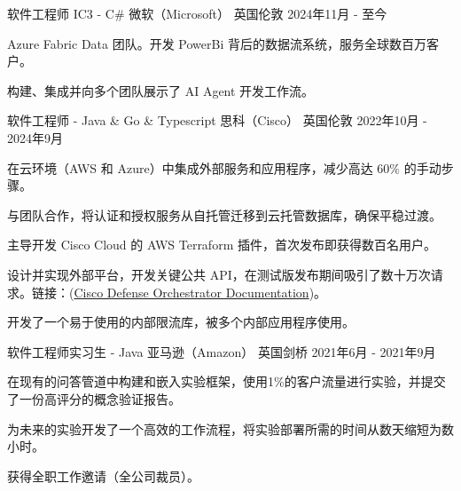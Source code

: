 
\begin{cventries}


\cventry
{软件工程师 IC3 - C\#} %
{微软（Microsoft）} %
{英国伦敦} %
{2024年11月 - 至今} %
{
\begin{cvitems} %
\item {Azure Fabric Data 团队。开发 PowerBi 背后的数据流系统，服务全球数百万客户。}
\item {构建、集成并向多个团队展示了 AI Agent 开发工作流。}
\end{cvitems}
}


\cventry
{软件工程师 - Java \& Go \& Typescript} %
{思科（Cisco）} %
{英国伦敦} %
{2022年10月 - 2024年9月} %
{
\begin{cvitems} %
\item {在云环境（AWS 和 Azure）中集成外部服务和应用程序，减少高达 60\% 的手动步骤。}
\item {与团队合作，将认证和授权服务从自托管迁移到云托管数据库，确保平稳过渡。}
\item {主导开发 Cisco Cloud 的 AWS Terraform 插件，首次发布即获得数百名用户。}
\item {设计并实现外部平台，开发关键公共 API，在测试版发布期间吸引了数十万次请求。链接：(\href{https://developer.cisco.com/docs/cisco-defense-orchestrator/}{Cisco Defense Orchestrator Documentation})。}
\item {开发了一个易于使用的内部限流库，被多个内部应用程序使用。}
\end{cvitems}
}

\cventry
{软件工程师实习生 - Java} %
{亚马逊（Amazon）} %
{英国剑桥} %
{2021年6月 - 2021年9月} %
{
\begin{cvitems} %
\item {在现有的问答管道中构建和嵌入实验框架，使用1\%的客户流量进行实验，并提交了一份高评分的概念验证报告。}
\item {为未来的实验开发了一个高效的工作流程，将实验部署所需的时间从数天缩短为数小时。}
\item {获得全职工作邀请（全公司裁员）。}
\end{cvitems}
}


\end{cventries}
